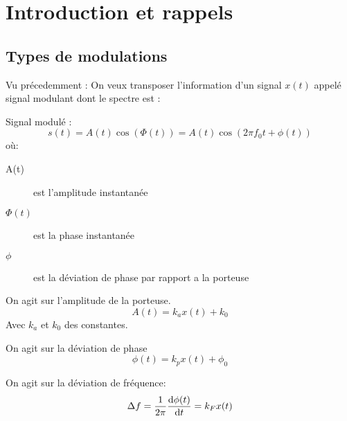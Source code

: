 \documentclass[main.tex]{subfiles}
\begin{document}
\section*{Introduction et rappels}
\subsection*{Types de modulations}
Vu précedemment :
On veux transposer l'information d'un signal $x(t)$ appelé signal modulant
dont le spectre est :
  \begin{center}
\end{center}


\begin{defin}
  Signal modulé :
  \[
    s(t) = A(t)\cos(\Phi(t))= A(t)\cos(2\pi f_0 t + \phi(t))
  \]
  où:
  \begin{description}
  \item[A(t)] est l'amplitude instantanée
  \item[$\Phi(t)$]  est la phase instantanée
  \item[$\phi$]  est la déviation de phase par rapport a la porteuse
  \end{description}
\end{defin}

\begin{prop}
  On agit sur l'amplitude de la porteuse.
  \[
    A(t) = k_ax(t)+k_0
  \]
  Avec $k_a$ et $k_0$ des constantes.

\end{prop}
\begin{prop}
  On agit sur la déviation de phase
  \[
    \phi(t) = k_p x(t)+\phi_0
  \]

\end{prop}
\begin{prop}
  On agit sur la déviation de fréquence:
  \[
    \Delta f = \frac{1}{2\pi}\deriv[\phi(t)]{t} = k_F x(t)
  \]
\end{prop}
\end{document}
